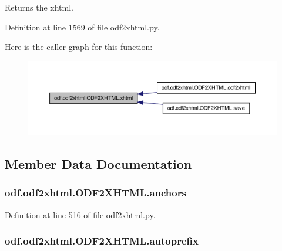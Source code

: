 Returns the xhtml. 



Definition at line 1569 of file odf2xhtml.\+py.



Here is the caller graph for this function\+:
\nopagebreak
\begin{figure}[H]
\begin{center}
\leavevmode
\includegraphics[width=350pt]{classodf_1_1odf2xhtml_1_1ODF2XHTML_ade09dcddfbaca47ffafa7ab8f305f1b4_icgraph}
\end{center}
\end{figure}




\subsection{Member Data Documentation}
\hypertarget{classodf_1_1odf2xhtml_1_1ODF2XHTML_ae998099d573b26bb4e129bce3cde4748}{
\subsubsection[{anchors}]{\setlength{\rightskip}{0pt plus 5cm}odf.\+odf2xhtml.\+O\+D\+F2\+X\+H\+T\+M\+L.\+anchors}}\label{classodf_1_1odf2xhtml_1_1ODF2XHTML_ae998099d573b26bb4e129bce3cde4748}


Definition at line 516 of file odf2xhtml.\+py.

\hypertarget{classodf_1_1odf2xhtml_1_1ODF2XHTML_a302ff4588ab242e144727d76160985d5}{
\subsubsection[{autoprefix}]{\setlength{\rightskip}{0pt plus 5cm}odf.\+odf2xhtml.\+O\+D\+F2\+X\+H\+T\+M\+L.\+autoprefix}}\label{classodf_1_1odf2xhtml_1_1ODF2XHTML_a302ff4588ab242e144727d76160985d5}


